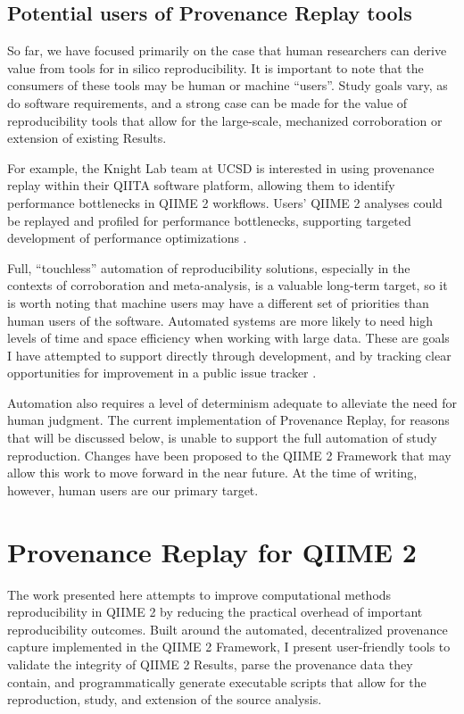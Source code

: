 \subsection{Potential users of Provenance Replay tools}
So far, we have focused primarily on the case that human researchers can derive
value from tools for in silico reproducibility. It is important to note that the
consumers of these tools may be human or machine “users”. Study goals vary, as
do software requirements, and a strong case can be made for the value of
reproducibility tools that allow for the large-scale, mechanized corroboration
or extension of existing Results.

For example, the Knight Lab team at UCSD is interested in using provenance
replay within their QIITA software platform, allowing them to identify
performance bottlenecks in QIIME 2 workflows. Users' QIIME 2 analyses could be
replayed and profiled for performance bottlenecks, supporting targeted
development of performance optimizations \parencite{caporaso_nci_2022}.

Full, “touchless” automation of reproducibility solutions, especially in the
contexts of corroboration and meta-analysis, is a valuable long-term target, so
it is worth noting that machine users may have a different set of priorities
than human users of the software. Automated systems are more likely to need high
levels of time and space efficiency when working with large data. These are
goals I have attempted to support directly through development, and by tracking
clear opportunities for improvement in a public issue tracker \parencite[Issues #29,
60, 62]{keefe_issues_2021}.

Automation also requires a level of determinism adequate to alleviate the need
for human judgment. The current implementation of Provenance Replay, for reasons
that will be discussed below, is unable to support the full automation of study
reproduction. Changes have been proposed to the QIIME 2 Framework that may allow
this work to move forward in the near future. At the time of writing, however,
human users are our primary target.


\section{Provenance Replay for QIIME 2}

The work presented here attempts to improve computational methods
reproducibility in QIIME 2 by reducing the practical overhead of important
reproducibility outcomes. Built around the automated, decentralized provenance
capture implemented in the QIIME 2 Framework, I present user-friendly tools to
validate the integrity of QIIME 2 Results, parse the provenance data they
contain, and programmatically generate executable scripts that allow for the
reproduction, study, and extension of the source analysis.

